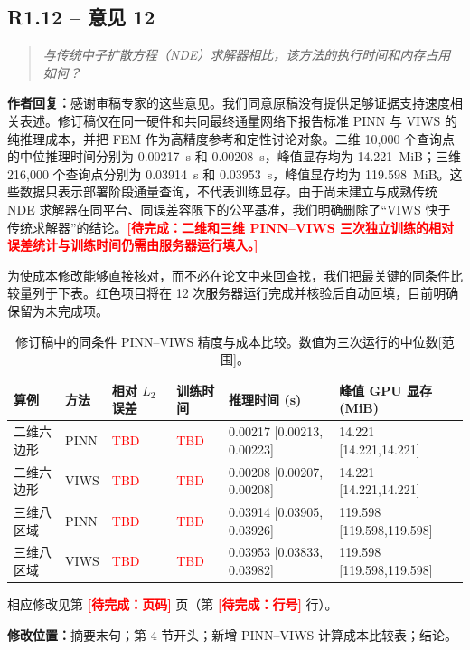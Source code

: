 \documentclass[11pt,a4paper]{article}
\newenvironment{reviewercomment}{\begin{quote}\small\itshape\color{commentgray}}{\end{quote}}
\newcommand{\authorresponse}{\noindent\textbf{作者回复：}\quad}
\newcommand{\revisionlocation}[1]{\par\noindent\textcolor{locationblue}{\textbf{修改位置：}}#1}
\newcommand{\draftplaceholder}[1]{\textcolor{red}{\textbf{[待完成：#1]}}}
\begin{document}
\subsection*{R1.12 -- 意见 12}
\begin{reviewercomment}
与传统中子扩散方程（NDE）求解器相比，该方法的执行时间和内存占用如何？
\end{reviewercomment}
\authorresponse 感谢审稿专家的这些意见。我们同意原稿没有提供足够证据支持速度相关表述。修订稿仅在同一硬件和共同最终通量网络下报告标准 PINN 与 VIWS 的纯推理成本，并把 FEM 作为高精度参考和定性讨论对象。二维 10,000 个查询点的中位推理时间分别为 0.00217~s 和 0.00208~s，峰值显存均为 14.221~MiB；三维 216,000 个查询点分别为 0.03914~s 和 0.03953~s，峰值显存均为 119.598~MiB。这些数据只表示部署阶段通量查询，不代表训练显存。由于尚未建立与成熟传统 NDE 求解器在同平台、同误差容限下的公平基准，我们明确删除了“VIWS 快于传统求解器”的结论。\draftplaceholder{二维和三维 PINN--VIWS 三次独立训练的相对误差统计与训练时间仍需由服务器运行填入。}

为使成本修改能够直接核对，而不必在论文中来回查找，我们把最关键的同条件比较量列于下表。红色项目将在 12 次服务器运行完成并核验后自动回填，目前明确保留为未完成项。

\begin{table}[H]
\centering
\scriptsize
\caption{修订稿中的同条件 PINN--VIWS 精度与成本比较。数值为三次运行的中位数[范围]。}
\label{tab:response_matched_cost_zh}
\renewcommand{\arraystretch}{1.15}
\begin{tabularx}{\textwidth}{@{}llXXXX@{}}
\toprule
算例 & 方法 & 相对 $L_2$ 误差 & 训练时间 & 推理时间 (s) & 峰值 GPU 显存 (MiB) \\
\midrule
二维六边形 & PINN & \textcolor{red}{TBD} & \textcolor{red}{TBD} & 0.00217 [0.00213, 0.00223] & 14.221 [14.221,14.221] \\
二维六边形 & VIWS & \textcolor{red}{TBD} & \textcolor{red}{TBD} & 0.00208 [0.00207, 0.00208] & 14.221 [14.221,14.221] \\
三维八区域 & PINN & \textcolor{red}{TBD} & \textcolor{red}{TBD} & 0.03914 [0.03905, 0.03926] & 119.598 [119.598,119.598] \\
三维八区域 & VIWS & \textcolor{red}{TBD} & \textcolor{red}{TBD} & 0.03953 [0.03833, 0.03982] & 119.598 [119.598,119.598] \\
\bottomrule
\end{tabularx}
\end{table}
相应修改见第 \draftplaceholder{页码} 页（第 \draftplaceholder{行号} 行）。
\revisionlocation{摘要末句；第 4 节开头；新增 PINN--VIWS 计算成本比较表；结论。}
\end{document}
